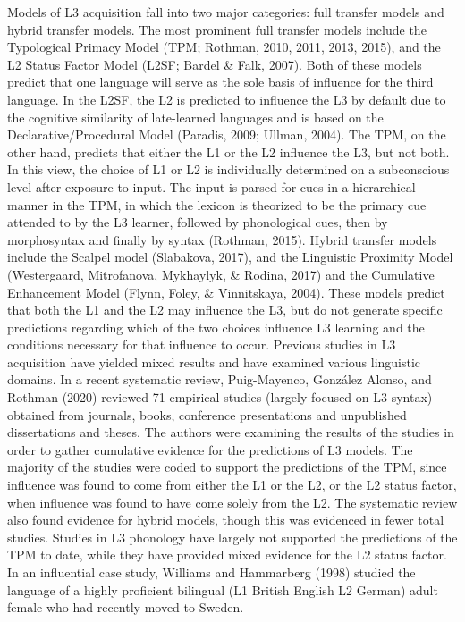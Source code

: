 \documentclass[
  english,
  man]{apa6}
\begin{document}
Models of L3 acquisition fall into two major categories: full transfer models and hybrid transfer models.
The most prominent full transfer models include the Typological Primacy Model (TPM; Rothman, 2010, 2011, 2013, 2015), and the L2 Status Factor Model (L2SF; Bardel \& Falk, 2007).
Both of these models predict that one language will serve as the sole basis of influence for the third language.
In the L2SF, the L2 is predicted to influence the L3 by default due to the cognitive similarity of late-learned languages and is based on the Declarative/Procedural Model (Paradis, 2009; Ullman, 2004).
The TPM, on the other hand, predicts that either the L1 or the L2 influence the L3, but not both.
In this view, the choice of L1 or L2 is individually determined on a subconscious level after exposure to input.
The input is parsed for cues in a hierarchical manner in the TPM, in which the lexicon is theorized to be the primary cue attended to by the L3 learner, followed by phonological cues, then by morphosyntax and finally by syntax (Rothman, 2015).
Hybrid transfer models include the Scalpel model (Slabakova, 2017), and the Linguistic Proximity Model (Westergaard, Mitrofanova, Mykhaylyk, \& Rodina, 2017) and the Cumulative Enhancement Model (Flynn, Foley, \& Vinnitskaya, 2004).
These models predict that both the L1 and the L2 may influence the L3, but do not generate specific predictions regarding which of the two choices influence L3 learning and the conditions necessary for that influence to occur.
Previous studies in L3 acquisition have yielded mixed results and have examined various linguistic domains.
In a recent systematic review, Puig-Mayenco, González Alonso, and Rothman (2020) reviewed 71 empirical studies (largely focused on L3 syntax) obtained from journals, books, conference presentations and unpublished dissertations and theses.
The authors were examining the results of the studies in order to gather cumulative evidence for the predictions of L3 models.
The majority of the studies were coded to support the predictions of the TPM, since influence was found to come from either the L1 or the L2, or the L2 status factor, when influence was found to have come solely from the L2.
The systematic review also found evidence for hybrid models, though this was evidenced in fewer total studies.
Studies in L3 phonology have largely not supported the predictions of the TPM to date, while they have provided mixed evidence for the L2 status factor.
In an influential case study, Williams and Hammarberg (1998) studied the language of a highly proficient bilingual (L1 British English L2 German) adult female who had recently moved to Sweden.
\end{document}
